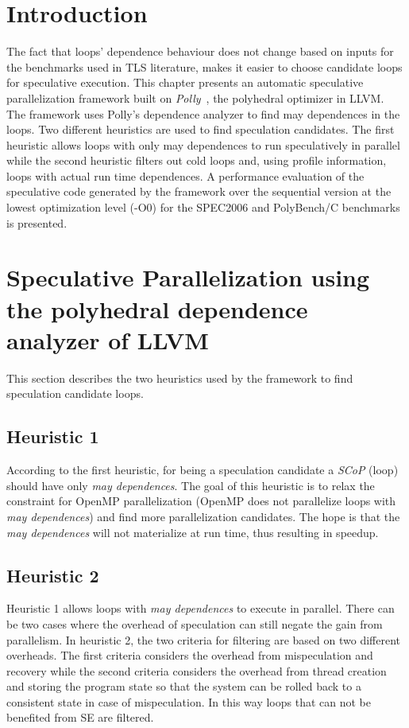 \documentclass[10pt]{report}          %
\begin{document}
\section{Introduction}

The fact that loops' dependence behaviour does not change based on inputs for the benchmarks used in TLS literature, makes it easier to choose candidate loops for speculative execution. This chapter presents an automatic speculative parallelization framework built on \textit{Polly}~\cite{grosserImpact11}, the polyhedral optimizer in LLVM.  The framework uses Polly's dependence analyzer to find may dependences in the loops.  Two different heuristics are used to find speculation candidates. The first heuristic allows loops with only may dependences to run speculatively in parallel while the second heuristic filters out cold loops and, using profile information, loops with actual run time dependences. A performance evaluation of the speculative code generated by the framework over the sequential version at the lowest optimization level (-O0) for the SPEC2006 and PolyBench/C benchmarks is presented.

\section{Speculative Parallelization using the polyhedral dependence analyzer of LLVM}
\label{section:heuristics}

This section describes the two heuristics used by the framework to find speculation candidate loops.  

\subsection{Heuristic 1}

According to the first heuristic,  for being a speculation candidate a \textit{SCoP} (loop) should have only \textit{may dependences}. The goal of this heuristic is to relax the constraint for OpenMP parallelization (OpenMP does not parallelize loops with \textit{may dependences}) and find more parallelization candidates.  The hope is that the \textit{may dependences} will not materialize at run time, thus resulting in speedup. 
 
\subsection{Heuristic 2}

Heuristic 1 allows loops with \textit{may dependences} to execute in parallel.  There can be two cases where the overhead of speculation can still negate the gain from parallelism. In heuristic 2, the two criteria for filtering are based on two different overheads. The first criteria considers the overhead from mispeculation and recovery while the second criteria considers the overhead from thread creation and storing the program state so that the system can be rolled back to a consistent state in case of mispeculation.  In this way loops that can not be benefited from SE are filtered. 
\end{document}
